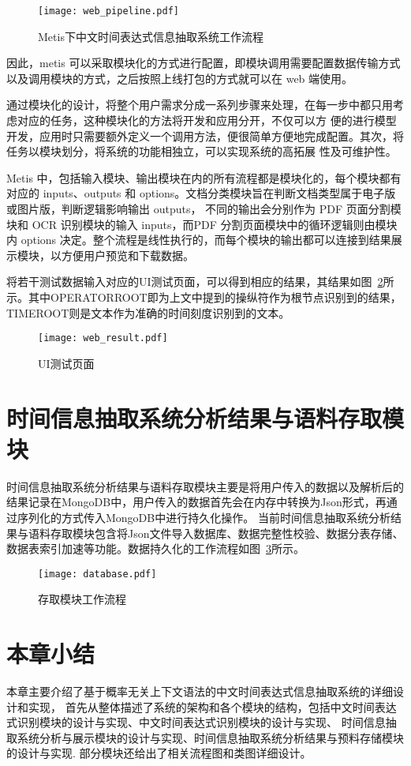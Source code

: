 \begin{figure}[h]
    \centering
    \texttt{[image: web\_pipeline.pdf]}
    \caption{Metis下中文时间表达式信息抽取系统工作流程}
    \label{fig:web_pipeline}
\end{figure}

因此，metis 可以采取模块化的方式进行配置，即模块调用需要配置数据传输方式以及调用模块的方式，之后按照上线打包的方式就可以在 web 端使用。

通过模块化的设计，将整个用户需求分成一系列步骤来处理，在每一步中都只用考虑对应的任务，这种模块化的方法将开发和应用分开，不仅可以方
便的进行模型开发，应用时只需要额外定义一个调用方法，便很简单方便地完成配置。其次，将任务以模块划分，将系统的功能相独立，可以实现系统的高拓展
性及可维护性。

Metis 中，包括输入模块、输出模块在内的所有流程都是模块化的，每个模块都有对应的 inputs、outputs 和 options。文档分类模块旨在判断文档类型属于电子版或图片版，判断逻辑影响输出 outputs，
不同的输出会分别作为 PDF 页面分割模块和 OCR 识别模块的输入 inputs，而PDF 分割页面模块中的循环逻辑则由模块内 options 决定。整个流程是线性执行的，而每个模块的输出都可以连接到结果展示模块，以方便用户预览和下载数据。

将若干测试数据输入对应的UI测试页面，可以得到相应的结果，其结果如图~\ref{fig:web_result}所示。其中OPERATORROOT即为上文中提到的操纵符作为根节点识别到的结果，TIMEROOT则是文本作为准确的时间刻度识别到的文本。

\begin{figure}[h]
    \centering
    \texttt{[image: web\_result.pdf]}
    \caption{UI测试页面}
    \label{fig:web_result}
\end{figure}

\section{时间信息抽取系统分析结果与语料存取模块}

时间信息抽取系统分析结果与语料存取模块主要是将用户传入的数据以及解析后的结果记录在MongoDB中，用户传入的数据首先会在内存中转换为Json形式，再通过序列化的方式传入MongoDB中进行持久化操作。
当前时间信息抽取系统分析结果与语料存取模块包含将Json文件导入数据库、数据完整性校验、数据分表存储、数据表索引加速等功能。数据持久化的工作流程如图~\ref{fig:database}所示。

\begin{figure}[h]
    \centering
    \texttt{[image: database.pdf]}
    \caption{存取模块工作流程}
    \label{fig:database}
\end{figure}

\section{本章小结}

本章主要介绍了基于概率无关上下文语法的中文时间表达式信息抽取系统的详细设计和实现，
首先从整体描述了系统的架构和各个模块的结构，包括中文时间表达式识别模块的设计与实现、中文时间表达式识别模块的设计与实现、
时间信息抽取系统分析与展示模块的设计与实现、时间信息抽取系统分析结果与预料存储模块的设计与实现.
部分模块还给出了相关流程图和类图详细设计。
